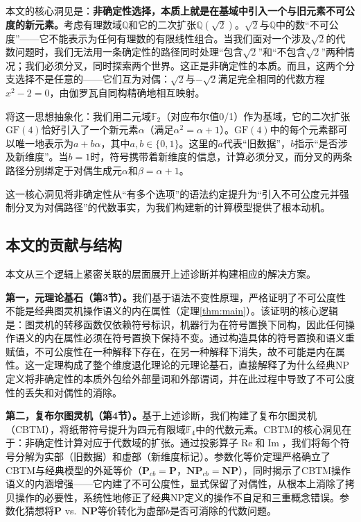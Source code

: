 \documentclass{ctexart}
\begin{document}
	本文的核心洞见是：\textbf{非确定性选择，本质上就是在基域中引入一个与旧元素不可公度的新元素。}考虑有理数域$\mathbb{Q}$和它的二次扩张$\mathbb{Q}(\sqrt{2})$。$\sqrt{2}$与$\mathbb{Q}$中的数``不可公度''——它不能表示为任何有理数的有限线性组合。当我们面对一个涉及$\sqrt{2}$的代数问题时，我们无法用一条确定性的路径同时处理``包含$\sqrt{2}$''和``不包含$\sqrt{2}$''两种情况；我们必须分叉，同时探索两个世界。这正是非确定性的本质。而且，这两个分支选择不是任意的——它们互为对偶：$\sqrt{2}$与$-\sqrt{2}$满足完全相同的代数方程$x^2-2=0$，由伽罗瓦自同构精确地相互映射。
	
	将这一思想抽象化：我们用二元域$\mathbb{F}_2$（对应布尔值0/1）作为基域，它的二次扩张$\mathrm{GF}(4)$恰好引入了一个新元素$\alpha$（满足$\alpha^2 = \alpha + 1$）。$\mathrm{GF}(4)$中的每个元素都可以唯一地表示为$a + b\alpha$，其中$a,b \in \{0,1\}$。这里的$a$代表``旧数据''，$b$指示``是否涉及新维度''。当$b=1$时，符号携带着新维度的信息，计算必须分叉，而分叉的两条路径分别绑定于对偶生成元$\alpha$和$\beta = \alpha+1$。
	
	这一核心洞见将非确定性从``有多个选项''的语法约定提升为``引入不可公度元并强制分叉为对偶路径''的代数事实，为我们构建新的计算模型提供了根本动机。
	
	\subsection{本文的贡献与结构}
	
	本文从三个逻辑上紧密关联的层面展开上述诊断并构建相应的解决方案。
	
	\textbf{第一，元理论基石（第3节）。}我们基于语法不变性原理，严格证明了不可公度性不能是经典图灵机操作语义的内在属性（定理\ref{thm:main}）。该证明的核心逻辑是：图灵机的转移函数仅依赖符号标识，机器行为在符号置换下同构，因此任何操作语义的内在属性必须在符号置换下保持不变。通过构造具体的符号置换和语义重赋值，不可公度性在一种解释下存在，在另一种解释下消失，故不可能是内在属性。这一定理构成了整个维度退化理论的元理论基石，直接解释了为什么经典NP定义将非确定性的本质外包给外部量词和外部谓词，并在此过程中导致了不可公度性的丢失和对偶性的消除。
	
	\textbf{第二，复布尔图灵机（第4节）。}基于上述诊断，我们构建了复布尔图灵机（CBTM），将纸带符号提升为四元有限域$\mathbb{F}_4$中的代数元素。CBTM的核心洞见在于：非确定性计算对应于代数域的扩张。通过投影算子$\operatorname{Re}$和$\operatorname{Im}$，我们将每个符号分解为实部（旧数据）和虚部（新维度标记）。参数化等价定理严格确立了CBTM与经典模型的外延等价（$\mathbf{P}_{cb}=\mathbf{P}$，$\mathbf{NP}_{cb}=\mathbf{NP}$），同时揭示了CBTM操作语义的内涵增强——它内建了不可公度性，显式保留了对偶性，从根本上消除了拷贝操作的必要性，系统性地修正了经典NP定义的操作不自足和三重概念错误。参数化猜想将$\mathbf{P}$ vs.\ $\mathbf{NP}$等价转化为虚部$b$是否可消除的代数问题。
	
\end{document}
